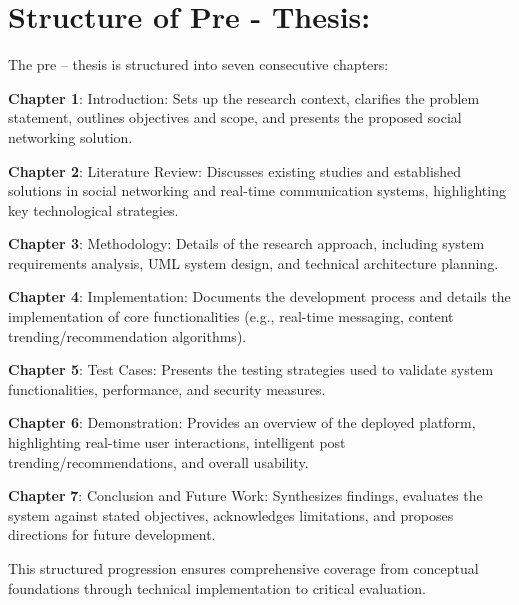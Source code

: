 \section{Structure of Pre - Thesis:}

The pre -- thesis is structured into seven consecutive chapters:

\textbf{Chapter 1}: Introduction: Sets up the research context, clarifies the problem statement, outlines objectives and scope, and presents the proposed social networking solution.

\textbf{Chapter 2}: Literature Review: Discusses existing studies and established solutions in social networking and real-time communication systems, highlighting key technological strategies.

\textbf{Chapter 3}: Methodology: Details of the research approach, including system requirements analysis, UML system design, and technical architecture planning.

\textbf{Chapter 4}: Implementation: Documents the development process and details the implementation of core functionalities (e.g., real-time messaging, content trending/recommendation algorithms).

\textbf{Chapter 5}: Test Cases: Presents the testing strategies used to validate system functionalities, performance, and security measures.

\textbf{Chapter 6}: Demonstration: Provides an overview of the deployed platform, highlighting real-time user interactions, intelligent post trending/recommendations, and overall usability.

\textbf{Chapter }\textbf{7}: Conclusion and Future Work: Synthesizes findings, evaluates the system against stated objectives, acknowledges limitations, and proposes directions for future development.

This structured progression ensures comprehensive coverage from conceptual foundations through technical implementation to critical evaluation.

